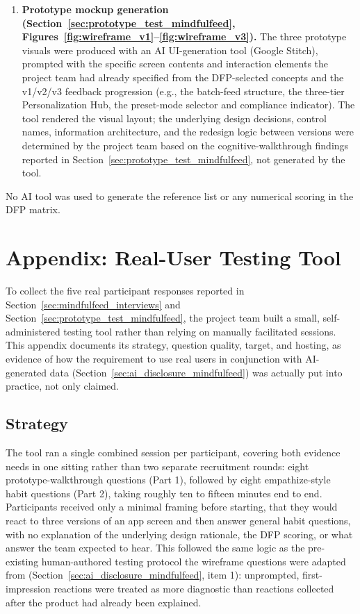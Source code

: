 \documentclass[11pt]{article}
\begin{document}
\begin{enumerate}
\item \textbf{Prototype mockup generation (Section~\ref{sec:prototype_test_mindfulfeed}, Figures~\ref{fig:wireframe_v1}--\ref{fig:wireframe_v3}).} The three prototype visuals were produced with an AI UI-generation tool (Google Stitch), prompted with the specific screen contents and interaction elements the project team had already specified from the DFP-selected concepts and the v1/v2/v3 feedback progression (e.g., the batch-feed structure, the three-tier Personalization Hub, the preset-mode selector and compliance indicator). The tool rendered the visual layout; the underlying design decisions, control names, information architecture, and the redesign logic between versions were determined by the project team based on the cognitive-walkthrough findings reported in Section~\ref{sec:prototype_test_mindfulfeed}, not generated by the tool.
\end{enumerate}

No AI tool was used to generate the reference list or any numerical scoring in the DFP matrix.

\clearpage
\section{Appendix: Real-User Testing Tool}
\label{sec:testing_tool_appendix}
To collect the five real participant responses reported in Section~\ref{sec:mindfulfeed_interviews} and Section~\ref{sec:prototype_test_mindfulfeed}, the project team built a small, self-administered testing tool rather than relying on manually facilitated sessions. This appendix documents its strategy, question quality, target, and hosting, as evidence of how the requirement to use real users in conjunction with AI-generated data (Section~\ref{sec:ai_disclosure_mindfulfeed}) was actually put into practice, not only claimed.

\subsection{Strategy}
The tool ran a single combined session per participant, covering both evidence needs in one sitting rather than two separate recruitment rounds: eight prototype-walkthrough questions (Part 1), followed by eight empathize-style habit questions (Part 2), taking roughly ten to fifteen minutes end to end. Participants received only a minimal framing before starting, that they would react to three versions of an app screen and then answer general habit questions, with no explanation of the underlying design rationale, the DFP scoring, or what answer the team expected to hear. This followed the same logic as the pre-existing human-authored testing protocol the wireframe questions were adapted from (Section~\ref{sec:ai_disclosure_mindfulfeed}, item 1): unprompted, first-impression reactions were treated as more diagnostic than reactions collected after the product had already been explained.
\end{document}
